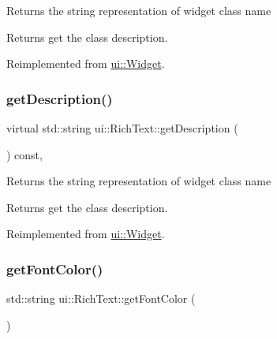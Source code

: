 Returns the string representation of widget class name \begin{DoxyReturn}{Returns}
get the class description. 
\end{DoxyReturn}


Reimplemented from \hyperlink{classui_1_1Widget_ad85abdaa9133dc6b8efc32670ae9b93f}{ui\+::\+Widget}.

\mbox{\label{classui_1_1RichText_aeae6c6fd1f11e9342ada2ef87dbf8681}} 
\subsubsection{\texorpdfstring{get\+Description()}{getDescription()}\hspace{0.1cm}{\footnotesize\ttfamily [2/2]}}
{\footnotesize\ttfamily virtual std\+::string ui\+::\+Rich\+Text\+::get\+Description (\begin{DoxyParamCaption}{ }\end{DoxyParamCaption}) const\hspace{0.3cm}{\ttfamily [override]}, {\ttfamily [virtual]}}

Returns the string representation of widget class name \begin{DoxyReturn}{Returns}
get the class description. 
\end{DoxyReturn}


Reimplemented from \hyperlink{classui_1_1Widget_ad85abdaa9133dc6b8efc32670ae9b93f}{ui\+::\+Widget}.

\mbox{\label{classui_1_1RichText_aac64b7e3593e6723d51d514ee03dc0e4}} 
\subsubsection{\texorpdfstring{get\+Font\+Color()}{getFontColor()}\hspace{0.1cm}{\footnotesize\ttfamily [1/2]}}
{\footnotesize\ttfamily std\+::string ui\+::\+Rich\+Text\+::get\+Font\+Color (\begin{DoxyParamCaption}{ }\end{DoxyParamCaption})}

